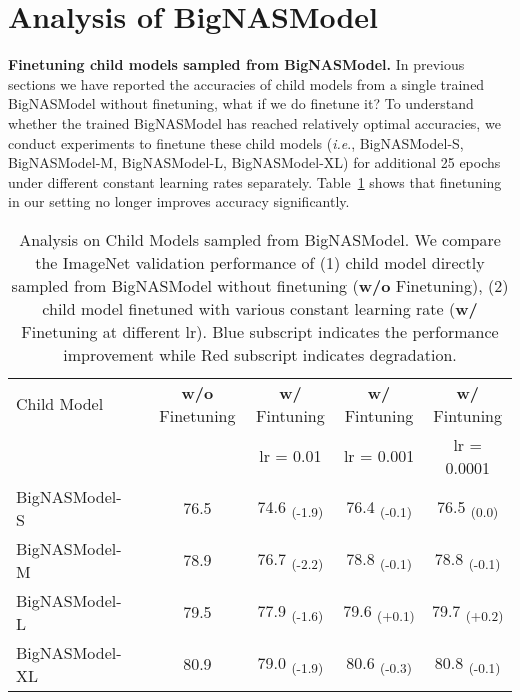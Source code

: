 \documentclass[runningheads]{llncs}
\def\onedot{.}
\def\ie{\emph{i.e}\onedot} \def\Ie{\emph{I.e}\onedot}
\begin{document}
\section{Analysis of BigNASModel}
\noindent\hspace{\parindent} \textbf{Finetuning child models sampled from BigNASModel.}
In previous sections we have reported the accuracies of child models from a single trained BigNASModel without finetuning, what if we do finetune it? To understand whether the trained BigNASModel has reached relatively optimal accuracies, we conduct experiments to finetune these child models (\ie, BigNASModel-S, BigNASModel-M, BigNASModel-L, BigNASModel-XL) for additional 25 epochs under different constant learning rates separately. Table~\ref{tabs:finetune} shows that finetuning in our setting no longer improves accuracy significantly.
\begin{table}[ht]
\centering
\caption{Analysis on Child Models sampled from BigNASModel. We compare the ImageNet validation performance of (1) child model directly sampled from BigNASModel without finetuning (\textbf{w/o} Finetuning), (2) child model finetuned with various constant learning rate (\textbf{w/} Finetuning at different lr). {\color{blue} Blue} subscript indicates the performance improvement while {\color{red} Red} subscript indicates degradation.}
\begin{tabular}{@{}l c | c | c | c | c @{}} \toprule
Child Model & & \textbf{w/o} Finetuning  & \textbf{w/} Fintuning & \textbf{w/} Fintuning  & \textbf{w/} Fintuning\\
& & & {\small lr = 0.01} & {\small lr = 0.001} & {\small lr = 0.0001}\\
\midrule
BigNASModel-S && 76.5 & 74.6 \textsubscript{\color{red} (-1.9)} & 76.4 \textsubscript{\color{red} (-0.1)} & 76.5 \textsubscript{(0.0)}\\
BigNASModel-M && 78.9 & 76.7 \textsubscript{\color{red} (-2.2)} & 78.8 \textsubscript{\color{red} (-0.1)} & 78.8 \textsubscript{\color{red} (-0.1)}\\
BigNASModel-L && 79.5 & 77.9 \textsubscript{\color{red} (-1.6)} & 79.6 \textsubscript{\color{blue} (+0.1)} & 79.7 \textsubscript{\color{blue} (+0.2)}\\
BigNASModel-XL && 80.9 & 79.0 \textsubscript{\color{red} (-1.9)} & 80.6 \textsubscript{\color{red} (-0.3)} & 80.8 \textsubscript{\color{red} (-0.1)}\\
\bottomrule
\end{tabular}
\label{tabs:finetune}
\end{table} \begin{table}[ht]

\end{table}
\end{document}
